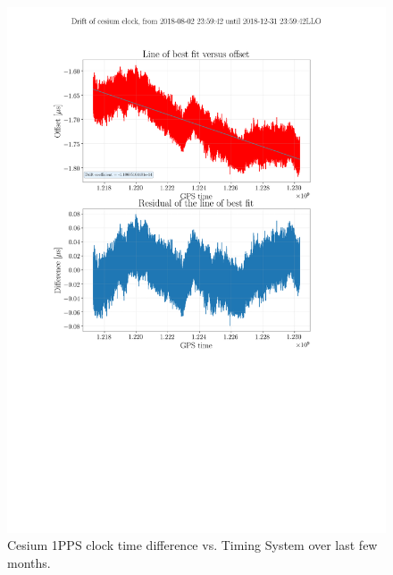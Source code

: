 \documentclass{article}
\begin{document}
\begin{figure}
  \includegraphics[width=\linewidth]{img/cesium-clock.png}
  \caption{Cesium 1PPS clock time difference vs. Timing System over last few months.}
  \label{fig:cesium}
\end{figure}
\clearpage
\end{document}
